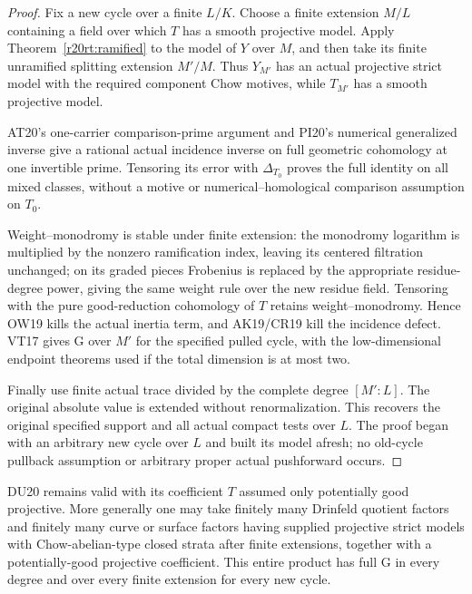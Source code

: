 \begin{proof}
Fix a new cycle over a finite $L/K$.  Choose a finite
extension $M/L$ containing a field over which $T$ has a
smooth projective model.  Apply Theorem~\ref{r20rt:ramified}
to the model of $Y$ over $M$, and then take its finite
unramified splitting extension $M'/M$.  Thus $Y_{M'}$
has an actual projective strict model with the required
component Chow motives, while $T_{M'}$ has a smooth
projective model.

AT20's one-carrier comparison-prime argument and PI20's
numerical generalized inverse give a rational actual
incidence inverse on full geometric cohomology at one
invertible prime.  Tensoring its error with
$\Delta_{T_0}$ proves the full identity on all mixed
classes, without a motive or numerical--homological
comparison assumption on $T_0$.

Weight--monodromy is stable under finite extension: the
monodromy logarithm is multiplied by the nonzero ramification
index, leaving its centered filtration unchanged; on its
graded pieces Frobenius is replaced by the appropriate
residue-degree power, giving the same weight rule over the
new residue field.  Tensoring with the pure good-reduction
cohomology of $T$ retains weight--monodromy.  Hence OW19
kills the actual inertia term, and AK19/CR19 kill the
incidence defect.  VT17 gives G over $M'$ for the specified
pulled cycle, with the low-dimensional endpoint theorems
used if the total dimension is at most two.

Finally use finite actual trace divided by the complete
degree $[M':L]$.  The original absolute value is extended
without renormalization.  This recovers the original
specified support and all actual compact tests over $L$.
The proof began with an arbitrary new cycle over $L$ and
built its model afresh; no old-cycle pullback assumption
or arbitrary proper actual pushforward occurs.
\end{proof}

\begin{corollary}
\label{r20rt:drinfeld}
DU20 remains valid with its coefficient $T$ assumed only
potentially good projective.  More generally one may take
finitely many Drinfeld quotient factors and finitely many
curve or surface factors having supplied projective strict
models with Chow-abelian-type closed strata after finite
extensions, together with a potentially-good projective
coefficient.  This entire product has full G in every
degree and over every finite extension for every new cycle.
\end{corollary}

